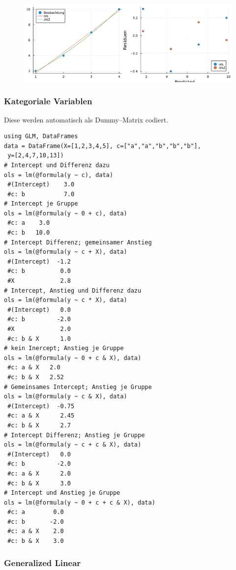 \documentclass[10pt,twocolumn]{scrartcl}
\begin{document}
\begin{figure}[ht]
  \centering
  \includegraphics[width=.95\columnwidth]{glm.pdf}
\end{figure}

\subsubsection{Kategoriale Variablen}
\label{ssec:kategorialeVariablen}

Diese werden automatisch als Dummy--Matrix codiert.

\begin{lstlisting}
using GLM, DataFrames
data = DataFrame(X=[1,2,3,4,5], c=["a","a","b","b","b"],
 y=[2,4,7,10,13])
# Intercept und Differenz dazu
ols = lm(@formula(y ~ c), data)
 #(Intercept)    3.0
 #c: b           7.0
# Intercept je Gruppe
ols = lm(@formula(y ~ 0 + c), data)
 #c: a    3.0
 #c: b   10.0
# Intercept Differenz; gemeinsamer Anstieg
ols = lm(@formula(y ~ c + X), data)
 #(Intercept)  -1.2
 #c: b          0.0
 #X             2.8
# Intercept, Anstieg und Differenz dazu
ols = lm(@formula(y ~ c * X), data)
 #(Intercept)   0.0
 #c: b         -2.0
 #X             2.0
 #c: b & X      1.0
# kein Inercept; Anstieg je Gruppe
ols = lm(@formula(y ~ 0 + c & X), data)
 #c: a & X   2.0
 #c: b & X   2.52
# Gemeinsames Intercept; Anstieg je Gruppe
ols = lm(@formula(y ~ c & X), data)
 #(Intercept)  -0.75
 #c: a & X      2.45
 #c: b & X      2.7
# Intercept Differenz; Anstieg je Gruppe
ols = lm(@formula(y ~ c + c & X), data)
 #(Intercept)   0.0
 #c: b         -2.0
 #c: a & X      2.0
 #c: b & X      3.0
# Intercept und Anstieg je Gruppe
ols = lm(@formula(y ~ 0 + c + c & X), data)
 #c: a        0.0
 #c: b       -2.0
 #c: a & X    2.0
 #c: b & X    3.0
\end{lstlisting}

\subsubsection{Generalized Linear}
\end{document}
